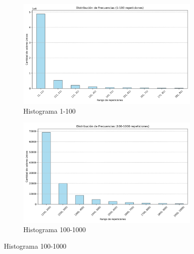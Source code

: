 \begin{figure}[htbp]
    \centering
    \begin{subfigure}[t]{0.48\textwidth-1em} %
        \includegraphics[width=\linewidth]{img/histograma_1_100.png}
        \caption{Histograma 1-100}
        \label{fig:sub1}
    \end{subfigure}
    \hfill %
    \begin{subfigure}[t]{0.48\textwidth-1em}
        \includegraphics[width=\linewidth]{img/histograma_100_1000.png}
        \caption{Histograma 100-1000}
        \label{fig:sub2}
    \end{subfigure}

    \vspace{0.5cm} %


\end{figure}
